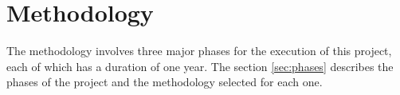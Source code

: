 \chapter{Methodology}

The methodology involves three major phases for the execution of this project, each of which has a duration of one year. The section \ref{sec:phases} 
describes the phases of the project and the methodology selected for each one. 


